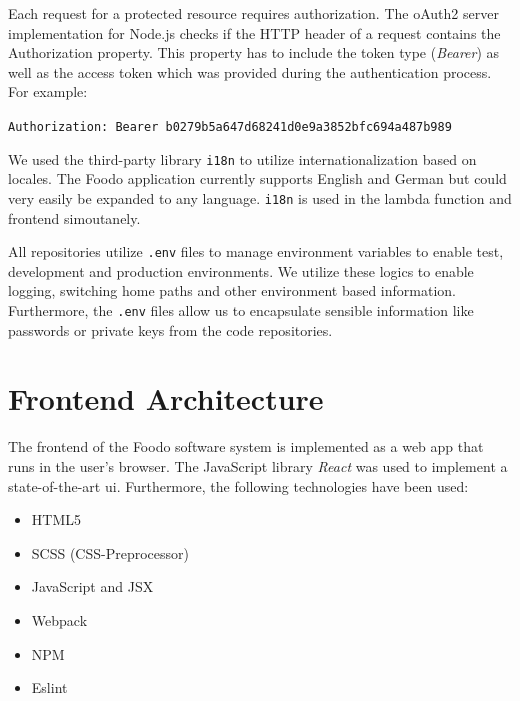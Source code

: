 
Each request for a protected resource requires authorization. The oAuth2 server implementation for Node.js checks if the HTTP header of a request contains the Authorization property. This property has to include the token type (\textit{Bearer}) as well as the access token which was provided during the authentication process. For example: \vspace{-1.5em}
\begin{center}
	\texttt{Authorization: Bearer b0279b5a647d68241d0e9a3852bfc694a487b989}
\end{center}


We used the third-party library \texttt{i18n} to utilize internationalization based on locales. The Foodo application currently supports English and German but could very easily be expanded to any language. \texttt{i18n} is used in the lambda function and frontend simoutanely. 


All repositories utilize \texttt{.env} files to manage environment variables to enable test, development and production environments. We utilize these logics to enable logging, switching home paths and other environment based information. Furthermore, the \texttt{.env} files allow us to encapsulate sensible information like passwords or private keys from the code repositories.

\section{Frontend Architecture}

The frontend of the Foodo software system is implemented as a web app that runs in the user’s browser. The JavaScript library \textit{React} was used to implement a state-of-the-art \gls{ui}. Furthermore, the following technologies have been used:

\begin{itemize}
		\itemsep-0.5em
	\item HTML5
	\item SCSS (CSS-Preprocessor)
	\item JavaScript and JSX
	\item Webpack 
	\item NPM
	\item Eslint
\end{itemize}

